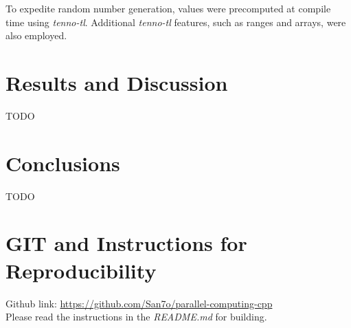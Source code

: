 \documentclass[conference]{IEEEtran}
\begin{document}
To expedite random number generation, values were precomputed at
compile time using \textit{tenno-tl}. Additional \textit{tenno-tl}
features, such as ranges and arrays, were also employed.

\section{Results and Discussion}

\iffalse
- Presentation of results \\
- Analysis and interpretation in context \\
- Comparison with the state-of-the-art \\
\fi

TODO

\section{Conclusions}

\iffalse
- Summary of the key findings and contributions
\fi 

TODO

\section{GIT and Instructions for Reproducibility}

Github link: \href{https://github.com/San7o/parallel-computing-cpp}{https://github.com/San7o/parallel-computing-cpp} \\
Please read the instructions in the \textit{README.md} for building.
\end{document}
